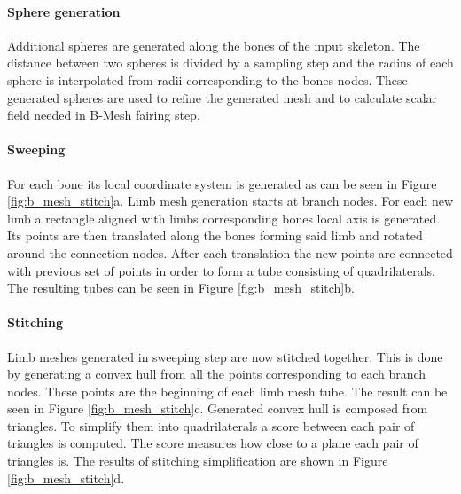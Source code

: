 \paragraph{Sphere generation}
Additional spheres are generated along the bones of the input skeleton.
The distance between two spheres is divided by a sampling step and the radius of each sphere is interpolated from radii corresponding to the bones nodes.
These generated spheres are used to refine the generated mesh and to calculate scalar field needed in B-Mesh fairing step.

\paragraph{Sweeping}
For each bone its local coordinate system is generated as can be seen in Figure \ref{fig:b_mesh_stitch}a. Limb mesh generation starts at branch nodes. For each new limb a rectangle aligned with limbs corresponding bones local axis is generated. Its points are then translated along the bones forming said limb and rotated around the connection nodes. After each translation the new points are connected with previous set of points in order to form a tube consisting of quadrilaterals. The resulting tubes can be seen in Figure \ref{fig:b_mesh_stitch}b.

\paragraph{Stitching}
Limb meshes generated in sweeping step are now stitched together. This is done by generating a convex hull from all the points corresponding to each branch nodes. These points are the beginning of each limb mesh tube. The result can be seen in Figure \ref{fig:b_mesh_stitch}c. Generated convex hull is composed from triangles. To simplify them into quadrilaterals a score between each pair of triangles is computed. The score measures how close to a plane each pair of triangles is. The results of stitching simplification are shown in Figure \ref{fig:b_mesh_stitch}d.

